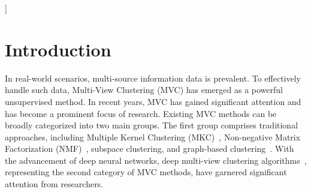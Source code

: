 \documentclass{article}
\theoremstyle{plain}
\theoremstyle{definition}
\theoremstyle{remark}
\begin{document}
\vskip 0.3in
]



\printAffiliationsAndNotice{}  %

\begin{abstract}


Leveraging the powerful representation learning capabilities, deep multi-view clustering methods have demonstrated reliable performance by effectively integrating multi-source information from diverse views in recent years. Most existing methods rely on the assumption of clean views. However, noise is pervasive in real-world scenarios, leading to a significant degradation in performance. To tackle this problem, we propose a novel multi-view clustering framework for the automatic identification and rectification of noisy data, termed AIRMVC. Specifically, we reformulate noisy identification as an anomaly identification problem using GMM. We then design a hybrid rectification strategy to mitigate the adverse effects of noisy data based on the identification results. Furthermore, we introduce a noise-robust contrastive mechanism to generate reliable representations. Additionally, we provide a theoretical proof demonstrating that these representations can discard noisy information, thereby improving the performance of downstream tasks. Extensive experiments on six benchmark datasets demonstrate that AIRMVC outperforms state-of-the-art algorithms in terms of robustness in noisy scenarios. The code of AIRMVC are available at https://github.com/xihongyang1999/AIRMVC on Github.


\end{abstract}

\section{Introduction}


In real-world scenarios, multi-source information data is prevalent. To effectively handle such data, Multi-View Clustering (MVC) has emerged as a powerful unsupervised method. In recent years, MVC has gained significant attention and has become a prominent focus of research. Existing MVC methods can be broadly categorized into two main groups. The first group comprises traditional approaches, including Multiple Kernel Clustering (MKC)~\cite{one}, Non-negative Matrix Factorization (NMF)~\cite{wenjie_mf}, subspace clustering\cite{ZHOU_1}, and graph-based clustering~\cite{suyuan_AAAI}. With the advancement of deep neural networks, deep multi-view clustering algorithms~\cite{DealMVC,sun2024robust}, representing the second category of MVC methods, have garnered significant attention from researchers.
\end{document}
